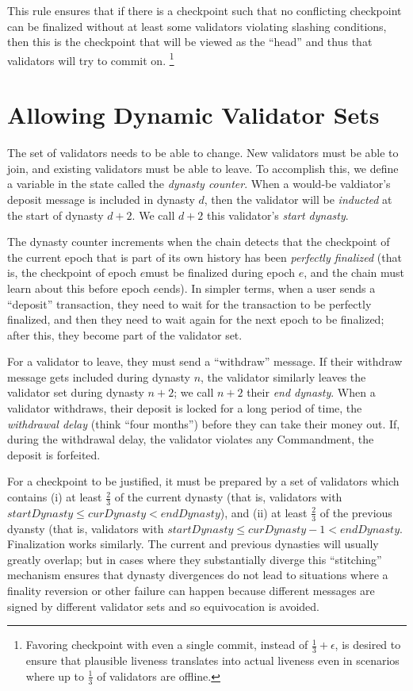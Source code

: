 \documentclass[12pt, final]{article}
\newcommand{\epoch}{\ensuremath{e}\space}
\begin{document}
This rule ensures that if there is a checkpoint such that no conflicting checkpoint can be finalized without at least some validators violating slashing conditions, then this is the checkpoint that will be viewed as the ``head'' and thus that validators will try to commit on. \footnote{Favoring checkpoint with even a single commit, instead of $\frac{1}{3} + \epsilon$, is desired to ensure that plausible liveness translates into actual liveness even in scenarios where up to $\frac{1}{3}$ of validators are offline.}

\section{Allowing Dynamic Validator Sets}
\label{sect:join_and_leave}

The set of validators needs to be able to change.  New validators must be able to join, and existing validators must be able to leave.  To accomplish this, we define a variable in the state called the \textit{dynasty counter}. When a would-be valdiator's deposit message is included in dynasty $d$, then the validator will be \textit{inducted} at the start of dynasty $d+2$.  We call $d+2$ this validator's \textit{start dynasty}.

The dynasty counter increments when the chain detects that the checkpoint of the current epoch that is part of its own history has been \textit{perfectly finalized} (that is, the checkpoint of epoch \epoch must be finalized during epoch \epoch, and the chain must learn about this before epoch \epoch ends). In simpler terms, when a user sends a ``deposit'' transaction, they need to wait for the transaction to be perfectly finalized, and then they need to wait again for the next epoch to be finalized; after this, they become part of the validator set.

For a validator to leave, they must send a ``withdraw'' message. If their withdraw message gets included during dynasty $n$, the validator similarly leaves the validator set during dynasty $n+2$; we call $n+2$ their \textit{end dynasty}. When a validator withdraws, their deposit is locked for a long period of time, the \textit{withdrawal delay} (think ``four months'') before they can take their money out. If, during the withdrawal delay, the validator violates any Commandment, the deposit is forfeited.

For a checkpoint to be justified, it must be prepared by a set of validators which contains (i) at least $\frac{2}{3}$ of the current dynasty (that is, validators with $startDynasty \le curDynasty < endDynasty$), and (ii) at least $\frac{2}{3}$ of the previous dyansty (that is, validators with $startDynasty \le curDynasty - 1 < endDynasty$. Finalization works similarly. The current and previous dynasties will usually greatly overlap; but in cases where they substantially diverge this ``stitching'' mechanism ensures that dynasty divergences do not lead to situations where a finality reversion or other failure can happen because different messages are signed by different validator sets and so equivocation is avoided.
\end{document}
